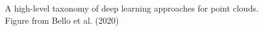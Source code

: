 \begin{figure}
\caption[Taxonomy of deep learning methods for point clouds.]{\label{fig-deep-learnin-on-point-clouds}A high-level taxonomy
of deep learning approaches for point clouds. Figure from Bello et al.
(2020)}
\end{figure}

